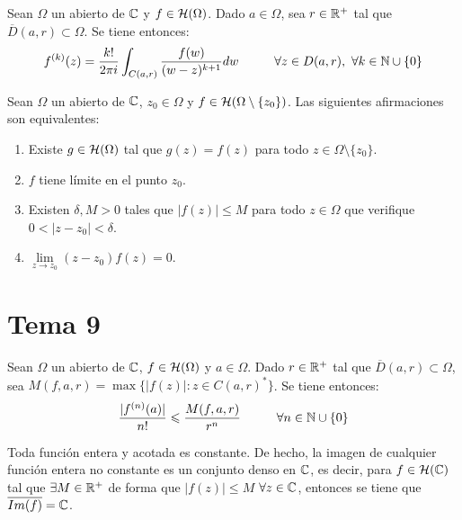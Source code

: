 \documentclass[12pt]{article}
\begin{document}
    \begin{prop} Sean $\Omega$ un abierto de $\mathbb{C}$ y $f\in \mathcal{H}(\Omega)$. Dado $a\in \Omega$, sea $r\in \mathbb{R}^+$ tal que $\overline{D}(a,r)\subset \Omega$. Se tiene entonces:
        \begin{gather*}
            f^{(k)} (z) = \frac{k!}{2\pi i } \int_{C(a,r)} \frac{f(w)}{(w-z)^{k+1}} dw \hspace{1cm} \forall z \in D(a,r),\ \forall k \in \mathbb{N}\cup \{0\}
        \end{gather*}
    \end{prop}

    \begin{teo}
        Sean $\Omega$ un abierto de $\mathbb{C}$, $z_0 \in \Omega$ y $f\in \mathcal{H}(\Omega\setminus \{z_0\})$. Las siguientes afirmaciones son equivalentes:
        \begin{enumerate}
            \item Existe $g\in \mathcal{H}(\Omega)$ tal que $g(z) = f(z)$ para todo $z\in \Omega \setminus \{z_0\}$.
            \item $f$ tiene límite en el punto $z_0$.
            \item Existen $\delta,M>0$ tales que $|f(z)|\leq M$ para todo $z \in \Omega$ que verifique $0 < |z - z_0| < \delta$.
            \item $\lim\limits_{z \to z_0} (z - z_0) f(z) = 0$.
        \end{enumerate}
    \end{teo}

    \section{Tema 9}

    \begin{prop} Sean $\Omega$ un abierto de $\mathbb{C}$, $f\in \mathcal{H}(\Omega)$ y $a\in \Omega$. Dado $r\in \mathbb{R}^+$ tal que $\overline{D}(a,r)\subset \Omega$, sea $M(f,a,r) = \max \{|f(z)|: z\in C(a,r)^*\}$. Se tiene entonces:
    \begin{gather*}
        \frac{|f^{(n)}(a)|}{n!} \leqslant \frac{M(f,a,r)}{r^n} \hspace{1cm} \forall n \in \mathbb{N}\cup \{0\}
    \end{gather*}       
    \end{prop}

    \begin{teo} Toda función entera y acotada es constante. De hecho, la imagen de cualquier función entera no constante es un conjunto denso en $\mathbb{C}$, es decir, para $f\in \mathcal{H}(\mathbb{C})$ tal que $\exists M\in \mathbb{R}^+$ de forma que $|f(z)| \leq M$ $\forall z \in \mathbb{C}$, entonces se tiene que $\overline{Im(f)} = \mathbb{C}$.
    \end{teo}
\end{document}
